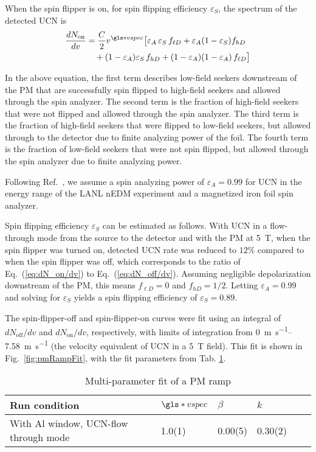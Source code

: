 When the spin flipper is on, for spin flipping efficiency $\varepsilon_S$, the spectrum of the detected UCN is
%
\begin{align}
    \frac{dN_\text{on}}{dv} &= \frac{C}{2} v^{\gls*{vspec}} \big[ \varepsilon_A\,\varepsilon_S\, f_{\ell D} + \varepsilon_A(1 - \varepsilon_S) f_{h D} \nonumber \\
    &\quad + (1 - \varepsilon_A)\varepsilon_S\,f_{h D}  + (1 - \varepsilon_A)(1-\varepsilon_A)\,f_{\ell D} \big]\label{eq:dN_on/dv}
\end{align}

In the above equation, the first term describes low-field seekers downstream of the PM that are successfully spin flipped to high-field seekers and allowed through the spin analyzer. The second term is the fraction of high-field seekers that were not flipped and allowed through the spin analyzer. The third term is the fraction of high-field seekers that were flipped to low-field seekers, but allowed through to the detector due to finite analyzing power of the foil. The fourth term is the fraction of low-field seekers that were not spin flipped, but allowed through the spin analyzer due to finite analyzing power.

Following Ref.~\cite{ThorstenThesis}, we assume a spin analyzing power of $\varepsilon_A=0.99$ for UCN in the energy range of the LANL nEDM experiment and a magnetized iron foil spin analyzer.

Spin flipping efficiency $\varepsilon_S$ can be estimated as follows. With UCN in a flow-through mode from the source to the detector and with the PM at \qty{5}{\tesla}, when the spin flipper was turned on, detected UCN rate was reduced to $12\%$ compared to when the spin flipper was off, which corresponds to the ratio of Eq.~(\ref{eq:dN_on/dv}) to Eq.~(\ref{eq:dN_off/dv}). Assuming negligible depolarization downstream of the PM, this means $f_{\ell D} = 0$ and $f_{hD} = 1/2$. Letting $\varepsilon_A=0.99$ and solving for $\varepsilon_S$ yields a spin flipping efficiency of $\varepsilon_S=0.89$.

The spin-flipper-off and spin-flipper-on curves were fit using an integral of $dN_\text{off}/dv$ and $dN_\text{on}/dv$, respectively, with limits of integration from \qtyrange{0}{7.58}{\meter\per\s} (the velocity equivalent of UCN in a \qty{5}{\tesla} field). This fit is shown in Fig.~\ref{fig:pmRampFit}, with the fit parameters from Tab. \ref{tb:pmRampFit}. 


\begin{table}
\centering
\caption{\label{tb:pmRampFit}Multi-parameter fit of a PM ramp}
\begin{tabular}{llllll}
\toprule
\multicolumn{1}{l}{Run condition} & \multicolumn{1}{l}{$\gls*{vspec}$} & \multicolumn{1}{l}{$\beta$} & \multicolumn{1}{l}{$k$} \\ 
\midrule
With Al window, UCN-flow through mode           & 1.0(1)      & 0.00(5)                 & 0.30(2)   \\
\bottomrule
\end{tabular}
\end{table}


